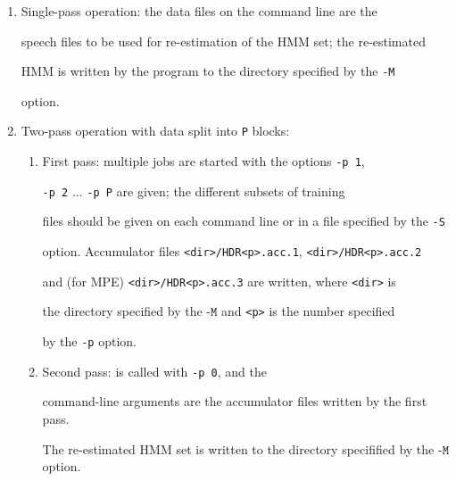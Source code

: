 \begin{enumerate}


\item Single-pass operation: the data files on the command line are the


  speech files to be used for re-estimation of the HMM set; the re-estimated


  HMM is written by the program to the directory specified by the {\texttt{-M}}


   option.


\item Two-pass operation with data split into \texttt{P} blocks:


   \begin{enumerate}  


     \item First pass: multiple jobs are started with the options \texttt{-p 1}, 


       \texttt{-p 2} $\ldots$ \texttt{-p P} are given; the different subsets of training


     files should be given on each command line or in a file specified by the \texttt{-S}


     option.  Accumulator files \texttt{<dir>/HDR<p>.acc.1},  \texttt{<dir>/HDR<p>.acc.2} 


    and (for MPE) \texttt{<dir>/HDR<p>.acc.3}  are written, where \texttt{<dir>} is


    the directory specified by the $\texttt{-M}$  and \texttt{<p>} is the number specified


     by the \texttt{-p} option.  


     \item Second pass:  is called with \texttt{-p 0}, and the


      command-line arguments are the accumulator files written by the first pass.


     The re-estimated HMM set is written to the directory specifified by the $\texttt{-M}$ option. 


   \end{enumerate}


\end{enumerate}













